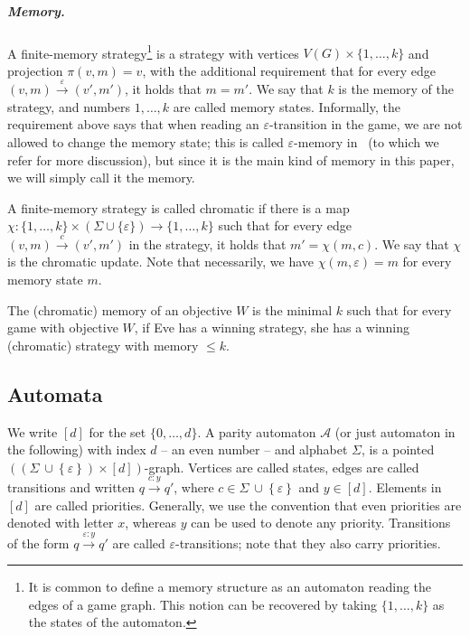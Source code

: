 \documentclass[a4paper,UKenglish,cleveref, thm-restate]{lipics-v2021}
\newcommand{\re}[1]{\xrightarrow{#1}}
\newcommand{\eps}{\varepsilon}
\newcommand{\A}{\mathcal{A}}
\newcommand{\Sigmaeps}{\Sigma\ {\cup} \left\{\eps\right\}}
\renewcommand{\d}{[d]}
\begin{document}
\subparagraph{Memory.} 
A finite-memory strategy\footnote{It is common to define a memory structure as an automaton reading the edges of a game graph. This notion can be recovered by taking $\{1,\dots,k\}$ as the states of the automaton.}
is a strategy with vertices $V(G) \times \{1,\dots,k\}$ and projection $\pi(v,m)=v$, with the additional requirement that for every edge $(v,m) \re \eps (v',m')$, it holds that $m=m'$.
We say that $k$ is the memory of the strategy, and numbers $1,\dots,k$ are called memory states.
Informally, the requirement above says that when reading an $\eps$-transition in the game, we are not allowed to change the memory state; this is called $\eps$-memory in~\cite{CO25LMCS} (to which we refer for more discussion), but since it is the main kind of memory in this paper, we will simply call it the memory.

A finite-memory strategy is called chromatic if there is a map $\chi:\{1,\dots,k\} \times (\Sigma \cup \{\varepsilon\}) \to \{1,\dots,k\}$ such that for every edge $(v,m) \re c (v',m')$ in the strategy, it holds that $m'=\chi(m,c)$.
We say that $\chi$ is the chromatic update.
Note that necessarily, we have $\chi(m,\eps)=m$ for every memory state $m$.


The (chromatic) memory of an objective $W$ is the minimal $k$ such that for every game with objective $W$, if Eve has a winning strategy, she has a winning (chromatic) strategy with memory $\leq k$.


\subsection{Automata}

We write $\d$ for the set $\{0,\dots,d\}$.
A parity automaton $\A$ (or just automaton in the following) with index $d$ -- an even number -- and alphabet $\Sigma$, is a pointed $((\Sigmaeps) \times \d)$-graph.
Vertices are called states, edges are called transitions and written $q \re{c:y} q'$, where $c \in \Sigmaeps$ and $y \in \d$.
Elements in $\d$ are called priorities.
Generally, we use the convention that even priorities are denoted with letter $x$, whereas $y$ can be used to denote any priority.
Transitions of the form $q \re{\eps:y} q'$ are called $\eps$-transitions; note that they also carry priorities.
\end{document}
